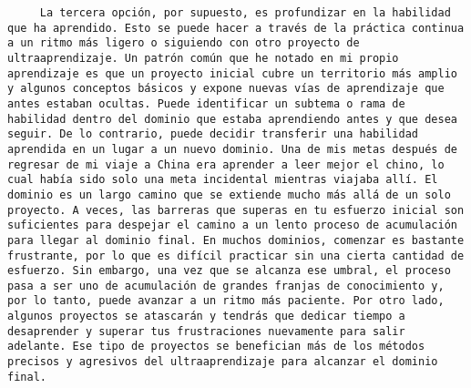 \begin{verbatim}
	 La tercera opción, por supuesto, es profundizar en la habilidad que ha aprendido. Esto se puede hacer a través de la práctica continua a un ritmo más ligero o siguiendo con otro proyecto de ultraaprendizaje. Un patrón común que he notado en mi propio aprendizaje es que un proyecto inicial cubre un territorio más amplio y algunos conceptos básicos y expone nuevas vías de aprendizaje que antes estaban ocultas. Puede identificar un subtema o rama de habilidad dentro del dominio que estaba aprendiendo antes y que desea seguir. De lo contrario, puede decidir transferir una habilidad aprendida en un lugar a un nuevo dominio. Una de mis metas después de regresar de mi viaje a China era aprender a leer mejor el chino, lo cual había sido solo una meta incidental mientras viajaba allí. El dominio es un largo camino que se extiende mucho más allá de un solo proyecto. A veces, las barreras que superas en tu esfuerzo inicial son suficientes para despejar el camino a un lento proceso de acumulación para llegar al dominio final. En muchos dominios, comenzar es bastante frustrante, por lo que es difícil practicar sin una cierta cantidad de esfuerzo. Sin embargo, una vez que se alcanza ese umbral, el proceso pasa a ser uno de acumulación de grandes franjas de conocimiento y, por lo tanto, puede avanzar a un ritmo más paciente. Por otro lado, algunos proyectos se atascarán y tendrás que dedicar tiempo a desaprender y superar tus frustraciones nuevamente para salir adelante. Ese tipo de proyectos se benefician más de los métodos precisos y agresivos del ultraaprendizaje para alcanzar el dominio final.
\end{verbatim}


